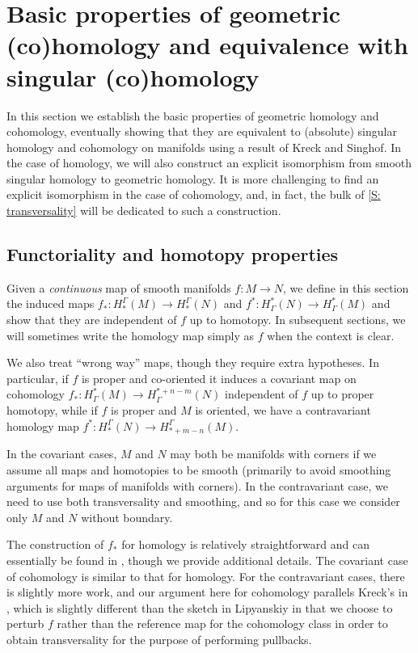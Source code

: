 
\section{Basic properties of geometric (co)homology and equivalence with singular (co)homology}\label{S: basic properties}

In this section we establish the basic properties of geometric homology and cohomology, eventually showing that they are equivalent to (absolute) singular homology and cohomology on manifolds using a result of Kreck and Singhof.
In the case of homology, we will also construct an explicit isomorphism from smooth singular homology to geometric homology.
It is more challenging to find an explicit isomorphism in the case of cohomology, and, in fact, the bulk of \cref{S: transversality} will be dedicated to such a construction.

\subsection{Functoriality and homotopy properties}\label{S: functoriality}

Given a \textit{continuous} map of smooth manifolds $f \colon M \to N$, we define in this section the induced maps $f_* \colon H_*^\Gamma(M) \to H_*^\Gamma(N)$ and $f^* \colon H^*_\Gamma(N) \to H^*_\Gamma(M)$ and show that they are independent of $f$ up to homotopy.
In subsequent sections, we will sometimes write the homology map simply as $f$ when the context is clear.

We also treat ``wrong way'' maps, though they require extra hypotheses.
In particular, if $f$ is proper and co-oriented it induces a covariant map on cohomology $f_* \colon H^*_\Gamma(M) \to H^{*+n-m}_\Gamma(N)$ independent of $f$ up to proper homotopy,
while if $f$ is proper and $M$ is oriented, we have a contravariant homology map $f^* \colon H_*^\Gamma(N) \to H_{*+m-n}^\Gamma(M)$.

In the covariant cases, $M$ and $N$ may both be manifolds with corners if we assume all maps and homotopies to be smooth (primarily to avoid smoothing arguments for maps of manifolds with corners).
In the contravariant case, we need to use both transversality and smoothing, and so for this case we consider only $M$ and $N$ without boundary.

The construction of $f_*$ for homology is relatively straightforward and can essentially be found in \cite[Section 6]{Lipy14}, though we provide additional details.
The covariant case of cohomology is similar to that for homology.
For the contravariant cases, there is slightly more work, and our argument here for cohomology parallels Kreck's in \cite{Krec10}, which is slightly different than the sketch in Lipyanskiy \cite[Section 6]{Lipy14} in that we choose to perturb $f$ rather than the reference map for the cohomology class in order to obtain transversality for the purpose of performing pullbacks.

